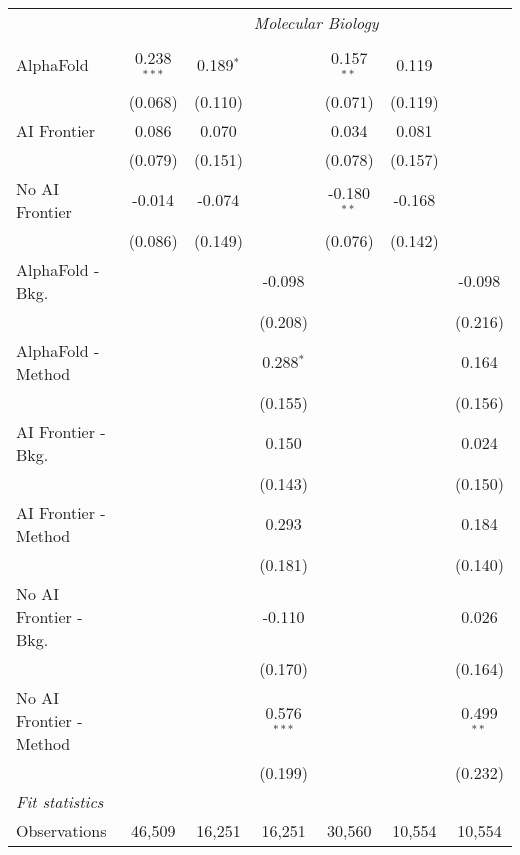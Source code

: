 \begin{tabular}{lcccccc}
 & \multicolumn{6}{c}{\textit{Molecular Biology}} \\ \\
   AlphaFold               & 0.238$^{***}$ & 0.189$^{*}$ &               & 0.157$^{**}$  & 0.119   &   \\   
                           & (0.068)       & (0.110)     &               & (0.071)       & (0.119) &   \\   
   AI Frontier             & 0.086         & 0.070       &               & 0.034         & 0.081   &   \\   
                           & (0.079)       & (0.151)     &               & (0.078)       & (0.157) &   \\   
   No AI Frontier          & -0.014        & -0.074      &               & -0.180$^{**}$ & -0.168  &   \\   
                           & (0.086)       & (0.149)     &               & (0.076)       & (0.142) &   \\   
   AlphaFold - Bkg.        &               &             & -0.098        &               &         & -0.098\\   
                           &               &             & (0.208)       &               &         & (0.216)\\   
   AlphaFold - Method      &               &             & 0.288$^{*}$   &               &         & 0.164\\   
                           &               &             & (0.155)       &               &         & (0.156)\\   
   AI Frontier - Bkg.      &               &             & 0.150         &               &         & 0.024\\   
                           &               &             & (0.143)       &               &         & (0.150)\\   
   AI Frontier - Method    &               &             & 0.293         &               &         & 0.184\\   
                           &               &             & (0.181)       &               &         & (0.140)\\   
   No AI Frontier - Bkg.   &               &             & -0.110        &               &         & 0.026\\   
                           &               &             & (0.170)       &               &         & (0.164)\\   
   No AI Frontier - Method &               &             & 0.576$^{***}$ &               &         & 0.499$^{**}$\\   
                           &               &             & (0.199)       &               &         & (0.232)\\   
   \midrule
   \emph{Fit statistics}\\
   Observations            & 46,509        & 16,251      & 16,251        & 30,560        & 10,554  & 10,554\\  
   

\end{tabular}
